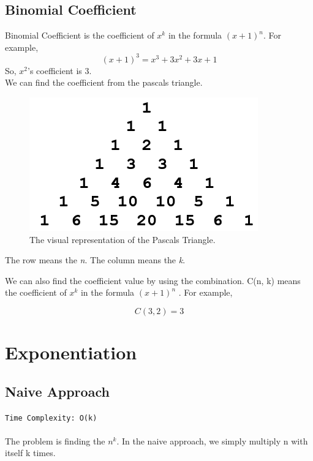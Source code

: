 \documentclass[12pt]{article}
\begin{document}
\subsection{Binomial Coefficient}
Binomial Coefficient is the coefficient of $x^k$ in the formula $(x+1)^n$. For example,
\[ (x+1)^3  = x^3 + 3x^2 + 3x + 1\]
So, $x^2$'s coefficient is 3. \\

We can find the coefficient from the pascals triangle.

\begin{figure}[H]
\centering
\includegraphics[]{Pascal.png}
\caption{The visual representation of the Pascals Triangle.}
\label{fig:pascal}
\end{figure}

The row means the \textit{n}. The column means the \textit{k}.

We can also find the coefficient value by using the combination. C(n, k) means the coefficient of $x^k$ in the formula $(x+1)^n$ \cite{binomialcoefficient}. For example,

\[ C(3, 2) = 3\]

\clearpage

\section{Exponentiation}
\subsection{Naive Approach }
\texttt{Time Complexity: O(k) } \\ \\
The problem is finding the $n^k$. In the naive approach, we simply multiply n with itself k times.
\end{document}
